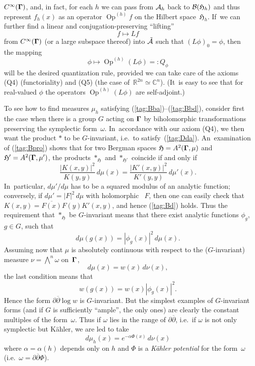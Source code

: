 \documentclass[12pt]{amsart}
\numberwithin{equation}{section}
\theoremstyle{remark}
\newcommand\AAA{{\Cal A}}
\newcommand\h{^{(h)}}
\newcommand\Omg{{\bigam}}   %
\newcommand\Oph{\operatorname{Op}\h}
\newcommand\HH{\mathfrak H}
\newcommand\RR{\mathbb R}
\newcommand{\CC}{\C}
\newcommand{\bigam}{\mbox{\boldmath $\Gamma$}}
\newcommand{\C}{\mathbb C}
\begin{document}
$C^\infty(\Omg)$, and, in fact, for each $h$ we can pass from $\AAA_h$ back
to $\Cal B(\HH_h)$ and thus represent $f_h(x)$ as an operator $\Oph f$ on the
Hilbert space~$\HH_h$. If~we can further find a linear and
conjugation-preserving ``lifting''
\begin{equation}  f\mapsto Lf  \label{tag:Bc}  \end{equation}
from $C^\infty(\Omg)$ (or a large subspace thereof) into $\tilde\AAA$ such
that $(L\phi)_0=\phi$, then the mapping
$$ \phi \mapsto \Oph (L\phi) =: Q_\phi  $$
will be the desired quantization rule, provided we can take care of the axioms
(Q4) (functoriality) and (Q5) (the case of~$\RR^{2n}\simeq\CC^n$). (It~is easy
to see that for real-valued $\phi$ the operators $\Oph(L\phi)$ are
self-adjoint.)

To see how to find measures $\mu_h$ satisfying
(\ref{tag:Bba})--(\ref{tag:Bbd}), consider first the case when there is a group
$G$ acting on $\Omg$ by biholomorphic transformations preserving the
symplectic form~$\omega$. In~accordance with our axiom (Q4), we then want the
product $*$ to be $G$-invariant, i.e.~to satisfy~(\ref{tag:Dda}).
An~examination of (\ref{tag:Bpro}) shows that for two Bergman spaces
$\HH=A^2(\Omg,\mu)$ and $\HH'=A^2(\Omg,\mu')$, the products $*_\HH$ and
$*_{\HH'}$ coincide if and only if
\begin{equation}  \frac{|K(x,y)|^2}{K(y,y)} \,d\mu(x) =
\frac{|K'(x,y)|^2}{K'(y,y)} \,d\mu'(x). \label{tag:Bd}  \end{equation}
In~particular, $d\mu'/d\mu$ has to be a squared modulus of an analytic
function; conversely, if $d\mu'=|F|^2\,d\mu$ with holomorphic ~$F$, then one
can easily check that $K(x,y)=\overline{F(x)}F(y) K'(x,y)$, and hence
(\ref{tag:Bd}) holds. Thus the requirement that $*_\HH$ be $G$-invariant means
that there exist analytic functions $\phi_g$, $g\in G$, such that
$$ d\mu(g(x)) = |\phi_g(x)|^2 \, d\mu(x).  $$
Assuming now that $\mu$ is absolutely continuous with respect to the
($G$-invariant) measure $\nu=\bigwedge^n\omega$ on~$\Omg$,
$$ d\mu(x) = w(x) \,d\nu(x),  $$
the last condition means that
$$ w(g(x)) = w(x) |\phi_g(x)|^2 .  $$
Hence the form $\partial\overline\partial\log w$ is $G$-invariant. But the
simplest examples of $G$-invariant forms (and if $G$ is sufficiently ``ample'',
the only ones) are clearly the constant multiples of the form~$\omega$. Thus if
$\omega$ lies in the range of $\partial\overline\partial$, i.e.~if $\omega$ is
not only symplectic but K\"ahler, we are led to take
\begin{equation}  d\mu_h(x) = e^{-\alpha \Phi(x)} \, d\nu(x)  \label{tag:Be}
\end{equation}
where $\alpha=\alpha(h)$ depends only on $h$ and $\Phi$ is a {\it K\"ahler
potential\/} for the form~$\omega$
(i.e.~$\omega=\partial\overline\partial\Phi$).
\end{document}

